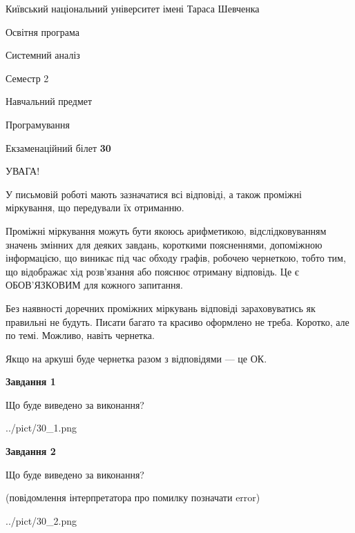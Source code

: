 \documentclass[12pt, ukrainian]{article}
\begin{document}
{{\begin {small}\par
{ \center  Київський національний університет імені Тараса Шевченка \par}
{\parbox {5 cm}{Освітня програма \hfill}{\parbox {7 cm}{Системний аналіз \hfill}}\parbox {6 cm}{\hfill Семестр 2}}\par
{\parbox {5 cm} {Навчальний предмет \hfill}\parbox {7 cm}{Програмування \hfill}\parbox {6cm}{\hfill}\par}\vspace{-7pt} \end{small}}{\center Екзаменаційний білет \No \textbf
{ 30 }\par}}
{
\begin {large}
УВАГА!

У письмовій роботі мають зазначатися всі відповіді, а також проміжні міркування, що передували їх отриманню.

Проміжні міркування можуть бути якоюсь арифметикою, відслідковуванням зна\-чень змінних для деяких завдань,
короткими поясненнями, допоміжною інформацією, що виникає під час обходу графів, робочею чернеткою,
тобто тим, що відображає хід розв’язання або пояснює отриману відповідь.
Це є ОБОВ’ЯЗКОВИМ для кожного запитання.

Без наявності доречних проміжних міркувань відповіді зараховуватись як правиль\-ні не будуть.
Писати багато та красиво оформлено не треба. Коротко, але по темі. Можли\-во, навіть чернетка.

Якщо на аркуші буде чернетка разом з відповідями --- це ОК.

\newpage

{\begin {center}\textbf{Завдання 1}\end {center}}\par
Що буде виведено за виконання?\par
\begin{center}
	{../pict/30_1.png}
\end{center}
\newpage

{\begin {center}\textbf{Завдання 2}\end {center}}\par
Що буде виведено за виконання?\par
 (повідомлення інтерпретатора про помилку позначати error)\par
\begin{center}
	{../pict/30_2.png}
\end{center}
\newpage


\end{large}}
\end{document}
